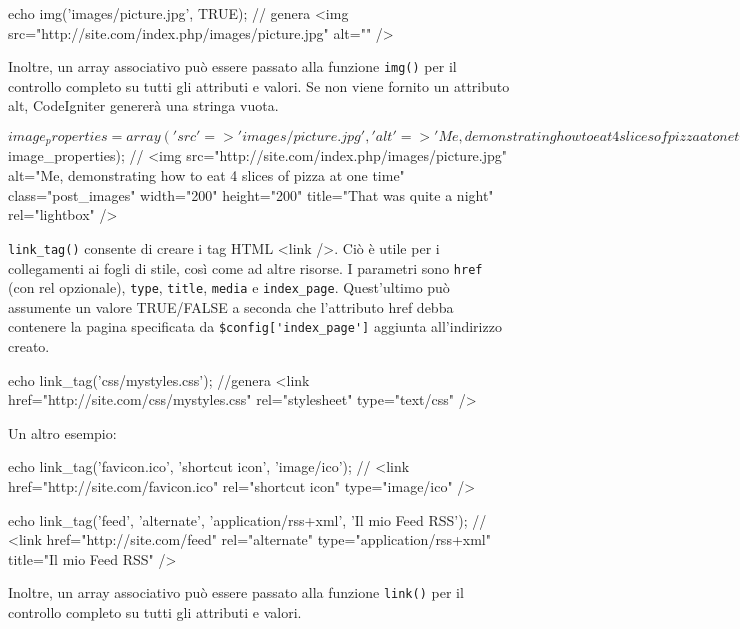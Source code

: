 \begin{code}
echo img('images/picture.jpg', TRUE);
// genera <img src="http://site.com/index.php/images/picture.jpg" alt="" />
\end{code}

Inoltre, un array associativo può essere passato alla funzione \verb|img()| per il controllo completo su tutti gli attributi e valori. Se non viene fornito un attributo alt, CodeIgniter genererà una stringa vuota.

\begin{code}
$image_properties = array(
          'src' => 'images/picture.jpg',
          'alt' => 'Me, demonstrating how to eat 4 slices of pizza at one time',
          'class' => 'post_images',
          'width' => '200',
          'height' => '200',
          'title' => 'That was quite a night',
          'rel' => 'lightbox',
);

echo img($image_properties);
// <img src="http://site.com/index.php/images/picture.jpg" alt="Me, demonstrating how to eat 4 slices of pizza at one time" class="post_images" width="200" height="200" title="That was quite a night" rel="lightbox" />
\end{code}

\verb|link_tag()| consente di creare i tag HTML <link />. Ciò è utile per i collegamenti ai fogli di stile, così come ad altre risorse. I parametri sono \verb|href| (con rel opzionale), \verb|type|, \verb|title|, \verb|media| e \verb|index_page|. Quest'ultimo può assumente un valore TRUE/FALSE a seconda che l'attributo href debba contenere la pagina specificata da \verb|$config['index_page']| aggiunta all'indirizzo creato.

\begin{code}
echo link_tag('css/mystyles.css');
//genera <link href="http://site.com/css/mystyles.css" rel="stylesheet" type="text/css" />
\end{code}

Un altro esempio:

\begin{code}
echo link_tag('favicon.ico', 'shortcut icon', 'image/ico');
// <link href="http://site.com/favicon.ico" rel="shortcut icon" type="image/ico" /> 

echo link_tag('feed', 'alternate', 'application/rss+xml', 'Il mio Feed RSS');
// <link href="http://site.com/feed" rel="alternate" type="application/rss+xml" title="Il mio Feed RSS" />
\end{code}

Inoltre, un array associativo può essere passato alla funzione \verb|link()| per il controllo completo su tutti gli attributi e valori.

